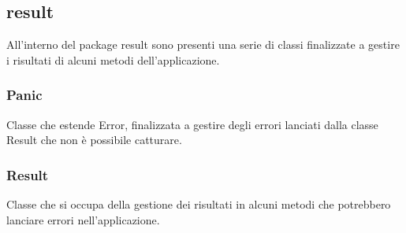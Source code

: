 \documentclass[a4paper, 12pt]{scrreprt}
\begin{document}
			\subsection{result}
				All'interno del package result sono presenti una serie di classi finalizzate a gestire i risultati di alcuni metodi dell'applicazione.
				
				\subsubsection{Panic}
				Classe che estende Error, finalizzata a gestire degli errori lanciati dalla classe Result che non \`e possibile catturare.

				\subsubsection{Result}
				Classe che si occupa della gestione dei risultati in alcuni metodi che potrebbero lanciare errori nell'applicazione.\\
\end{document}
